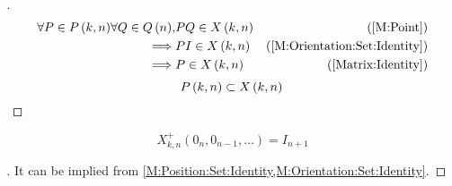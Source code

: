 \documentclass[stu, babel, american, biblatex, a4paper, leqno, draftall]{apa7}
\begin{document}
\begin{proof}[]
    \begin{align*}
        \forall{P \in P\left(k,n\right)}
        \forall{Q\in Q\left(n\right)},
                                  &
        P Q \in X\left(k,n\right) & \text{(\cref{M:Point})}                    \\
        \implies                  &
        P I \in X\left(k,n\right) & \text{(\cref{M:Orientation:Set:Identity})} \\
        \implies                  &
        P \in X\left(k,n\right)   & \text{(\cref{Matrix:Identity})}
    \end{align*}
    \begin{equation*}
        P\left(k,n\right)\subset X\left(k,n\right) \qedhere
    \end{equation*}
\end{proof}
\begin{corollary}\label{M:Point:Set:Identity}
    \begin{equation*}
        X^{+}_{k,n}
        \left(0_{n}, 0_{n-1}, \dots\right)
        =
        I_{n+1}
    \end{equation*}
\end{corollary}
\begin{proof}[]
    It can be implied from \cref{M:Position:Set:Identity,M:Orientation:Set:Identity}.
\end{proof}
\end{document}
